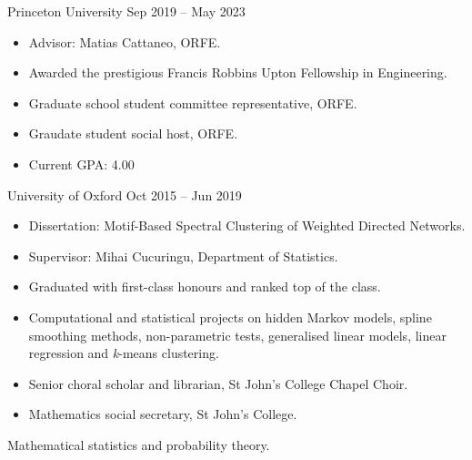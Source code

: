 \documentclass[
  date,
  number,
]{wgu-cv}
\begin{document}
\maketitle





{Princeton University}
{Sep 2019 -- May 2023}

\begin{itemize}
  \item Advisor: Matias Cattaneo, ORFE.
	\item Awarded the prestigious Francis Robbins Upton Fellowship in Engineering.
  \item Graduate school student committee representative, ORFE.
  \item Graudate student social host, ORFE.
  \item Current GPA: 4.00
\end{itemize}


{University of Oxford}
{Oct 2015 -- Jun 2019}

\begin{itemize}
  \item Dissertation:
    Motif-Based Spectral Clustering of Weighted Directed Networks.
  \item Supervisor:
    Mihai Cucuringu,
    Department of Statistics.
  \item Graduated with first-class honours and ranked top of the class.
  \item Computational and statistical projects on
    hidden Markov models,
    spline smoothing methods,
    non-parametric tests,
    generalised linear models,
    linear regression
    and
    \textit{k}-means clustering.
	\item Senior choral scholar and librarian,
    St John's College Chapel Choir.
	\item Mathematics social secretary, St John's College.
\end{itemize}



Mathematical statistics and probability theory.
\end{document}
